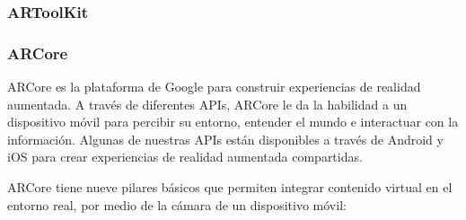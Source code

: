 \subsubsection{ARToolKit}
\noindent

\subsubsection{ARCore}
ARCore es la plataforma de Google para construir experiencias de realidad aumentada. A través de diferentes APIs, ARCore le da la habilidad a un dispositivo móvil para percibir su entorno, entender el mundo e interactuar con la información. Algunas de nuestras APIs están disponibles a través de Android y iOS para crear experiencias de realidad aumentada compartidas.\par
ARCore tiene nueve pilares básicos que permiten integrar contenido virtual en el entorno real, por medio de la cámara de un dispositivo móvil:

